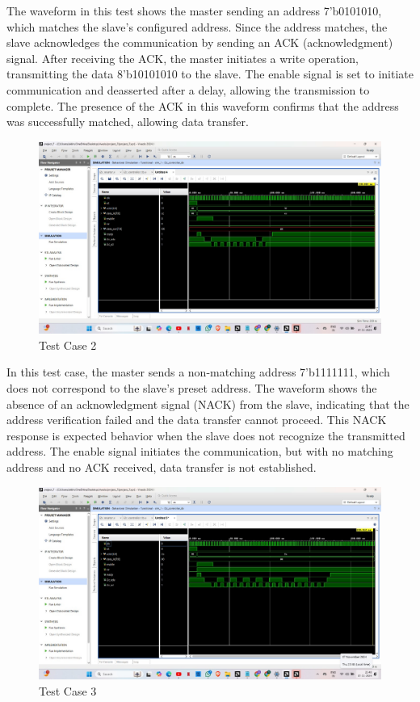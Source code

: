 \documentclass[a4paper,12pt]{report}
\begin{document}
\noindent The waveform in this test shows the master sending an address 7'b0101010, which matches the slave’s configured address. Since the address matches, the slave acknowledges the communication by sending an ACK (acknowledgment) signal. After receiving the ACK, the master initiates a write operation, transmitting the data 8'b10101010 to the slave. The enable signal is set to initiate communication and deasserted after a delay, allowing the transmission to complete. The presence of the ACK in this waveform confirms that the address was successfully matched, allowing data transfer.

\FloatBarrier

\begin{figure}[H] %
    \centering
    \includegraphics[width=\textwidth]{TEST-CASE-2.jpg}
    \caption{Test Case 2}
\end{figure}
\FloatBarrier

\noindent In this test case, the master sends a non-matching address 7'b1111111, which does not correspond to the slave’s preset address. The waveform shows the absence of an acknowledgment signal (NACK) from the slave, indicating that the address verification failed and the data transfer cannot proceed. This NACK response is expected behavior when the slave does not recognize the transmitted address. The enable signal initiates the communication, but with no matching address and no ACK received, data transfer is not established.

\FloatBarrier

\newpage 

\begin{figure}[H] %
    \centering
    \includegraphics[width=\textwidth]{TEST-CASE-3.jpg}
    \caption{Test Case 3}
\end{figure}
\FloatBarrier
\end{document}
